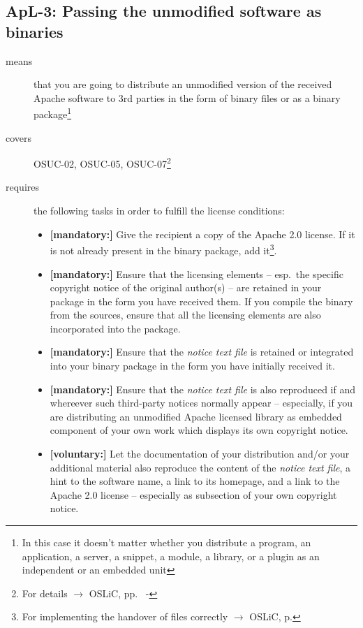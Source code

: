 \subsection{ApL-3: Passing the unmodified software as binaries} 

\begin{description}
\item[means] that you are going to distribute an unmodified version of the
received Apache software to 3rd parties in the form of binary files or as a
bi\-na\-ry package\footnote{In this case it doesn't matter whether you 
distribute a program, an application, a server, a snippet, a module, a library,
or a plugin as an independent or an embedded unit}

\item[covers] OSUC-02, OSUC-05, OSUC-07\footnote{For details $\rightarrow$ OSLiC, pp.\
\pageref{OSUC-02-DEF} - \pageref{OSUC-07-DEF}}

\item[requires] the following tasks in order to fulfill the license conditions:
\begin{itemize}
  \item \textbf{[mandatory:]} Give the recipient a copy of the Apache 2.0
  license. If it is not already present in the binary package, add
  it\footnote{For implementing the handover of files correctly $\rightarrow$
  OSLiC, p. \pageref{DistributingFilesHint}}.
  
  \item \textbf{[mandatory:]} Ensure that the licensing elements -- esp.\ the
  specific copyright notice of the original author(s) -- are retained in your
  package in the form you have received them. If you compile the binary from the
  sources, ensure that all the licensing elements are also incorporated into the
  package.
  \item \textbf{[mandatory:]} Ensure that the \emph{notice text file} is
  retained or integrated into your binary package in the form you have initially
  received
  it.
  \item \textbf{[mandatory:]} Ensure that the \emph{notice text file} is also
  reproduced if and whereever such third-party notices normally appear --
  especially, if you are distributing an unmodified Apache licensed library as
  embedded component of your own work which displays its own copyright notice.
  
  \item \textbf{[voluntary:]} Let the documentation of your distribution and/or
  your additional material also reproduce the content of the \emph{notice text
  file}, a hint to the software name, a link to its homepage, and a link to the
  Apache 2.0 license -- especially as subsection of your own copyright notice.
\end{itemize}


\end{description}
